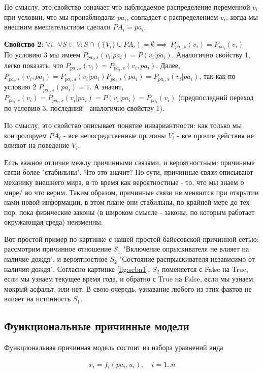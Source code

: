 \documentclass[fleqn]{article}
\begin{document}
По смыслу, это свойство означает что наблюдаемое распределение переменной $v_i$ при условии, что мы пронаблюдали $pa_i$, совпадает с распределением $v_i$, когда мы внешним вмешательством сделали $PA_i = pa_i$.

\textbf{Свойство 2}: $\forall i, \ \forall S \subset V: S \cap (\{V_i\} \cup PA_i) = \emptyset \implies \ P_{pa_i, s}(v_i) = P_{pa_i}(v_i)$\\
По условию 3 мы имеем $P_{pa_i,s}(v_i|pa_i) = P(v_i|pa_i)$.
Аналогично свойству 1, легко показать, что $P_{pa_i,s}(v_i) = P_{pa_i,s}(v_i, pa_i)$. Далее, $P_{pa_i,s}(v_i, pa_i) = P_{pa_i,s}(v_i|pa_i)P_{pa_i,s}(pa_i) = P_{pa_i,s}(v_i|pa_i)$, так как по условию 2 $P_{pa_i,s}(pa_i) = 1$. А значит, $P_{pa_i,s}(v_i) = P_{pa_i,s}(v_i|pa_i) = P(v_i|pa_i) = P_{pa_i}(v_i)$ (предпоследний переход по условию 3, последний - аналогично свойству 1).

По смыслу, это свойство описывает понятие инвариантности: как только мы контролируем $PA_i$ - все непосредственные причины $V_i$ - все прочие действия не влияют на поведение $V_i$.

Есть важное отличие между причинными связями, и вероятностным: причинные связи более "стабильны". Что это значит? По сути, причинные связи описывают механику внешнего мира, в то время как вероятностные - то, что мы знаем о мире/ во что верим. Таким образом, причинные связи не меняются при открытии нами новой информации, в этом плане они стабильны, по крайней мере до тех пор, пока физические законы (в широком смысле - законы, по которым работает окружающая среда) неизменны.

Вот простой пример по картинке с нашей простой байесовской причинной сетью: рассмотрим причинное отношение $S_1$ "Включение опрыскивателя не влияет на наличие дождя", и вероятностное $S_2$ "Состояние распрыскивателя независимо от наличия дождя". Согласно картинке \ref{fig:scbn1}, $S_2$ поменяется с False на True, если мы узнаем текущее время года, и обратно с True на False, если мы узнаем, мокрый асфальт, или нет. В свою очередь, узнавание любого из этих фактов не влияет на истинность $S_1$. 

\subsection*{Функциональные причинные модели}

Функциональная причинная модель состоит из набора уравнений вида 

\begin{align}
	x_i = f_i(pa_i, u_i),& \  i=1..n
	\label{eq:causal_eq}
\end{align}
\end{document}
